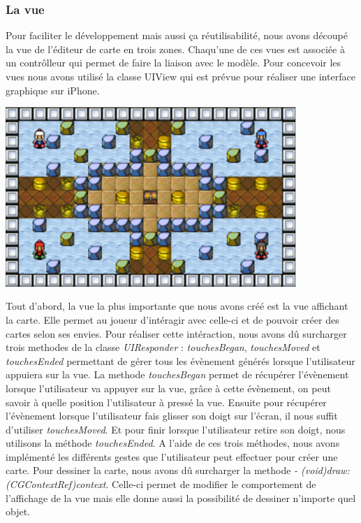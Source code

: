 	\subsubsection{La vue}
		Pour faciliter le développement mais aussi ça réutilisabilité, nous avons découpé la vue de l'éditeur de carte en trois zones. Chaqu'une de ces vues est associée à un contrôlleur qui permet de faire la liaison avec le modèle. Pour concevoir les vues nous avons utilisé la classe UIView qui est prévue pour réaliser une interface graphique sur iPhone. 
			
		\begin{center}
			\includegraphics[width=11cm]{./Developpement/Img/carte.eps}
		\end{center}
		Tout d'abord, la vue la plus importante que nous avons créé est la vue affichant la carte. Elle permet au joueur d'intéragir avec celle-ci et de pouvoir créer des cartes selon ses envies. Pour réaliser cette intéraction, nous avons dû surcharger trois methodes de la classe \textit{UIResponder} : \textit{touchesBegan}, \textit{touchesMoved} et \textit{touchesEnded} permettant de gérer tous les évènement générés lorsque l'utilisateur appuiera sur la vue. La methode \textit{touchesBegan} permet de récupérer l'évènement lorsque l'utilisateur va appuyer sur la vue, grâce à cette évènement, on peut savoir à quelle position l'utilisateur à pressé la vue. Ensuite pour récupérer l'évènement lorsque l'utilisateur fais glisser son doigt sur l'écran, il nous suffit d'utiliser \textit{touchesMoved}. Et pour finir lorsque l'utilisateur retire son doigt, nous utilisons la méthode \textit{touchesEnded}. A l'aide de ces trois méthodes, nous avons implémenté les différents gestes que l'utilisateur peut effectuer pour créer une carte. Pour dessiner la carte, nous avons dû surcharger la methode \textit{- (void)draw:(CGContextRef)context}. Celle-ci permet de modifier le comportement de l'affichage de la vue mais elle donne aussi la possibilité de dessiner n'importe quel objet.
		
